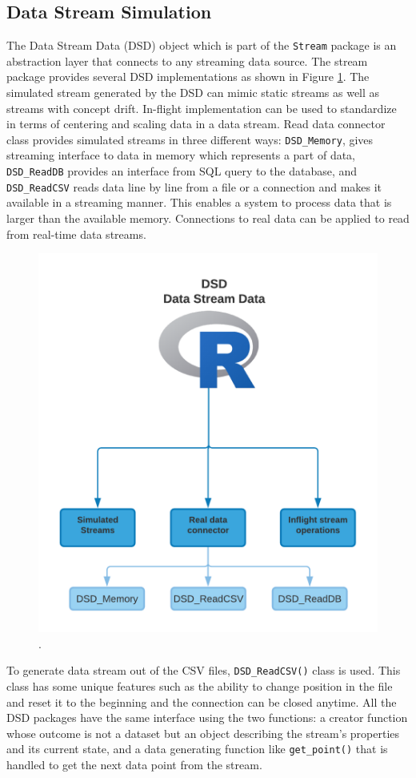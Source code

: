 \subsection{Data Stream Simulation}
The Data Stream Data (DSD) object which is part of the \texttt{Stream} package is an abstraction layer that connects to any streaming data source. The stream package provides several DSD implementations as shown in Figure \ref{dsd}. The simulated stream generated by the DSD can mimic static streams as well as streams with concept drift. In-flight implementation can be used to standardize in terms of centering and scaling data in a data stream. %
Read data connector class provides simulated streams in three different ways: \texttt{DSD\_Memory}, gives streaming interface to data in memory which represents a part of data, \texttt{DSD\_ReadDB} provides an interface from SQL query to the database, and \texttt{DSD\_ReadCSV} reads data line by line from a file or a connection and makes it available in a streaming manner. This enables a system to process data that is larger than the available memory. Connections to real data can be applied to read from real-time data streams.

\begin{figure}[!htb]
    \centering
    \includegraphics[width = 8 cm]{image/Chapters/Chapter5/dsd.png}
    \caption{ .}
    \label{dsd}
\end{figure}


To generate data stream out of the CSV files, \texttt{DSD\_ReadCSV()} class is used. This class has some unique features such as the ability to change position in the file and reset it to the beginning and the connection can be closed anytime. All the DSD packages have the same interface using the two functions: a creator function whose outcome is not a dataset but an object describing the stream's properties and its current state, and a data generating function like \texttt{get\_point()} that is handled to get the next data point from the stream.

